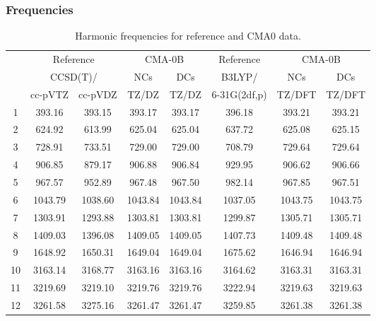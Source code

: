 \documentclass[10pt,oneside]{article}
\begin{document}
\subsubsection*{Frequencies}
\begin{table}[h!]
\centering
\caption{Harmonic frequencies for reference and CMA0 data.}
\begin{tabular}{cccccccc}
\toprule
{} & \multicolumn{2}{c}{Reference} & \multicolumn{2}{c}{CMA-0B} &    Reference & \multicolumn{2}{c}{CMA-0B} \\
{} & \multicolumn{2}{c}{CCSD(T)/} &     NCs &     DCs &       B3LYP/ &     NCs &     DCs \\
{} &   cc-pVTZ & cc-pVDZ &   TZ/DZ &   TZ/DZ & 6-31G(2df,p) &  TZ/DFT &  TZ/DFT \\
\midrule
1  &    393.16 &  393.15 &  393.17 &  393.17 &       396.18 &  393.21 &  393.21 \\
2  &    624.92 &  613.99 &  625.04 &  625.04 &       637.72 &  625.08 &  625.15 \\
3  &    728.91 &  733.51 &  729.00 &  729.00 &       708.79 &  729.64 &  729.64 \\
4  &    906.85 &  879.17 &  906.88 &  906.84 &       929.95 &  906.62 &  906.66 \\
5  &    967.57 &  952.89 &  967.48 &  967.50 &       982.14 &  967.85 &  967.51 \\
6  &   1043.79 & 1038.60 & 1043.84 & 1043.84 &      1037.05 & 1043.75 & 1043.75 \\
7  &   1303.91 & 1293.88 & 1303.81 & 1303.81 &      1299.87 & 1305.71 & 1305.71 \\
8  &   1409.03 & 1396.08 & 1409.05 & 1409.05 &      1407.73 & 1409.48 & 1409.48 \\
9  &   1648.92 & 1650.31 & 1649.04 & 1649.04 &      1675.62 & 1646.94 & 1646.94 \\
10 &   3163.14 & 3168.77 & 3163.16 & 3163.16 &      3164.62 & 3163.31 & 3163.31 \\
11 &   3219.69 & 3219.10 & 3219.76 & 3219.76 &      3222.94 & 3219.63 & 3219.63 \\
12 &   3261.58 & 3275.16 & 3261.47 & 3261.47 &      3259.85 & 3261.38 & 3261.38 \\
\bottomrule
\end{tabular}
\end{table}

\clearpage
\end{document}
